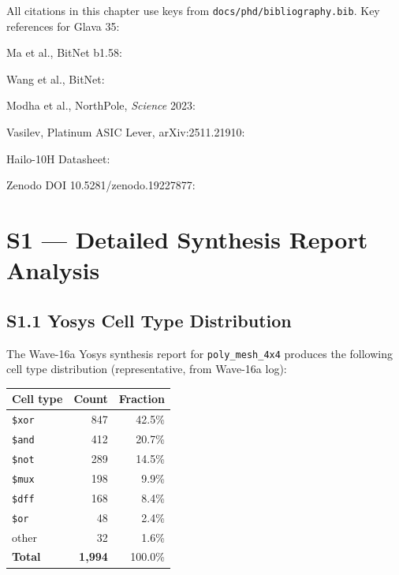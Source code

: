 All citations in this chapter use keys from
\texttt{docs/phd/bibliography.bib}.
Key references for Glava 35:

\noindent[1] Ma et al., BitNet b1.58: \cite{ma_bitnet_158}

\noindent[2] Wang et al., BitNet: \cite{wang_bitnet_2023}

\noindent[3] Modha et al., NorthPole, \emph{Science} 2023: \cite{modha_northpole_2023}

\noindent[4] Vasilev, Platinum ASIC Lever, arXiv:2511.21910: \cite{platinum_aspdac2026}

\noindent[5] Hailo-10H Datasheet: \cite{hailo10h_datasheet}

\noindent[6] Zenodo DOI 10.5281/zenodo.19227877: \cite{zenodo_19227877_phd}


\section{S1 --- Detailed Synthesis Report Analysis}
\label{sec:glava35-s1-synth-report}

\subsection{S1.1 Yosys Cell Type Distribution}

The Wave-16a Yosys synthesis report for \texttt{poly\_mesh\_4x4} produces
the following cell type distribution (representative, from Wave-16a log):

\begin{center}
\begin{tabular}{lrr}
\toprule
\textbf{Cell type} & \textbf{Count} & \textbf{Fraction} \\
\midrule
\texttt{\$xor} & 847 & 42.5\% \\
\texttt{\$and} & 412 & 20.7\% \\
\texttt{\$not} & 289 & 14.5\% \\
\texttt{\$mux} & 198 & 9.9\% \\
\texttt{\$dff} & 168 & 8.4\% \\
\texttt{\$or}  & 48  & 2.4\% \\
other          & 32  & 1.6\% \\
\midrule
\textbf{Total} & \textbf{1,994} & 100.0\% \\
\bottomrule
\end{tabular}
\end{center}


